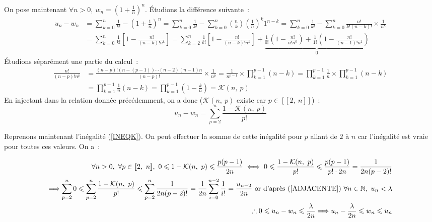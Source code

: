 \documentclass{article}
\begin{document}
  On pose maintenant $\forall n > 0,\ w_n = \left(1 + \frac{1}{n}\right)^n$. Étudions la différence suivante~:
  \begin{align*}
    u_n - w_n &= \sum_{k=0}^n \frac{1}{k!} - \left(1 + \frac{1}{n}\right)^n = \sum_{k=0}^n \frac{1}{k!} - \sum_{k=0}^n\binom{n}{k}\left(\frac{1}{n}\right)^k 1^{n-k} = \sum_{k=0}^n \frac{1}{k!} - \sum_{k=0}^n \frac{n!}{k!(n - k)!}\times \frac{1}{n^k} \\
    &= \sum_{k=0}^n \frac{1}{k!}\left[1 - \frac{n!}{(n - k)! n^k}\right] = \sum_{k=2}^n \frac{1}{k!}\left[1 - \frac{n!}{(n - k)! n^k}\right] + \underbrace{\frac{1}{0!}\left(1 - \frac{n!}{n!n^0}\right) + \frac{1}{1!}\left(1 - \frac{n!}{(n-1)!n^1}\right)}_{0}
  \end{align*}
  Étudions séparément une partie du calcul~:
  \begin{align*}
    \frac{n!}{(n - p)! n^p} &= \frac{(n-p)!(n-(p-1))\cdots(n-2)(n-1)n}{(n-p)!} \times \frac{1}{n^p} = \frac{1}{n^{p-1}}\times\prod_{k=1}^{p-1}(n-k) = \prod_{k=1}^{p-1} \frac{1}{n} \times \prod_{k=1}^{p-1}(n-k)  \\
    &= \prod_{k=1}^{p-1}\frac{1}{n}(n - k)=\prod_{k=1}^{p-1}\left(1 - \frac{k}{n}\right) = \mathcal{K}(n,\ p)
  \end{align*}
  En injectant dans la relation donnée précédemment, on a donc ($\mathcal{K}(n,\ p)$ existe car $p\in[\![2,\ n]\!]$)~:
  \begin{equation}\label{SOMMEK}
    u_n - w_n = \sum_{p=2}^{n}\frac{1 - \mathcal{K}(n,\ p)}{p!}
  \end{equation}

  Reprenons maintenant l'inégalité (\ref{INEQK}). On peut effectuer la somme de cette inégalité pour $p$ allant de $2$ à $n$ car l'inégalité est vraie pour toutes ces valeurs. On a~:

  \begin{align*}
    \forall n>0,\ \forall p\in[\![2,\ n]\!],\ 0 \leqslant 1 - \mathcal{K}(n,\ p) \leqslant \frac{p(p - 1)}{2n}
    \iff 0 \leqslant \frac{1 - \mathcal{K}(n,\ p)}{p!} \leqslant \frac{p(p - 1)}{p!\cdot 2n} = \frac{1}{2n(p-2)!} \\
    \Longrightarrow \sum_{p=2}^n 0 \leqslant \sum_{p=2}^n \frac{1 - \mathcal{K}(n,\ p)}{p!} \leqslant \sum_{p=2}^n \frac{1}{2n(p-2)!} =
    \frac{1}{2n}\sum_{i=0}^{n-2} \frac{1}{i!} = \frac{u_{n-2}}{2n} \text{ or d'après (\ref{ADJACENTE}) } \forall n\in\mathbb{N},\ u_n < \lambda \\
    \therefore 0 \leqslant u_n - w_n \leqslant \frac{\lambda}{2n} \Longrightarrow u_n - \frac{\lambda}{2n} \leqslant w_n \leqslant u_n
  \end{align*}
\end{document}
